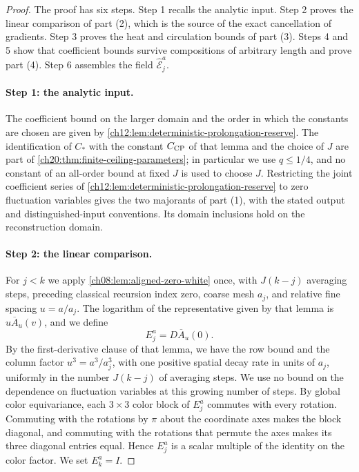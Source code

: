 \begin{proof}
The proof has six steps. Step 1 recalls the analytic input. Step 2 proves the linear comparison of part (2), which is the source of the exact cancellation of gradients. Step 3 proves the heat and circulation bounds of part (3). Steps 4 and 5 show that coefficient bounds survive compositions of arbitrary length and prove part (4). Step 6 assembles the field $\widehat{\mathcal E}_j^a$.

\paragraph{Step 1: the analytic input.}
The coefficient bound on the larger domain and the order in which the constants are chosen are given by \cref{ch12:lem:deterministic-prolongation-reserve}. The identification of $C_*$ with the constant $C_{\rm CP}$ of that lemma and the choice of $J$ are part of \cref{ch20:thm:finite-ceiling-parameters}; in particular we use $q\le1/4$, and no constant of an all-order bound at fixed $J$ is used to choose $J$. Restricting the joint coefficient series of \cref{ch12:lem:deterministic-prolongation-reserve} to zero fluctuation variables gives the two majorants of part (1), with the stated output and distinguished-input conventions. Its domain inclusions hold on the reconstruction domain.

\paragraph{Step 2: the linear comparison.}
For $j<k$ we apply \cref{ch08:lem:aligned-zero-white} once, with $J(k-j)$ averaging steps, preceding classical recursion index zero, coarse mesh $a_j$, and relative fine spacing $u=a/a_j$. The logarithm of the representative given by that lemma is $u\overline A_u(v)$, and we define
\[
 E_j^a=D\overline A_u(0).
\]
By the first-derivative clause of that lemma, we have the row bound and the column factor $u^3=a^3/a_j^3$, with one positive spatial decay rate in units of $a_j$, uniformly in the number $J(k-j)$ of averaging steps. We use no bound on the dependence on fluctuation variables at this growing number of steps. By global color equivariance, each $3\times3$ color block of $E_j^a$ commutes with every rotation. Commuting with the rotations by $\pi$ about the coordinate axes makes the block diagonal, and commuting with the rotations that permute the axes makes its three diagonal entries equal. Hence $E_j^a$ is a scalar multiple of the identity on the color factor. We set $E_k^a=I$.


\end{proof}
